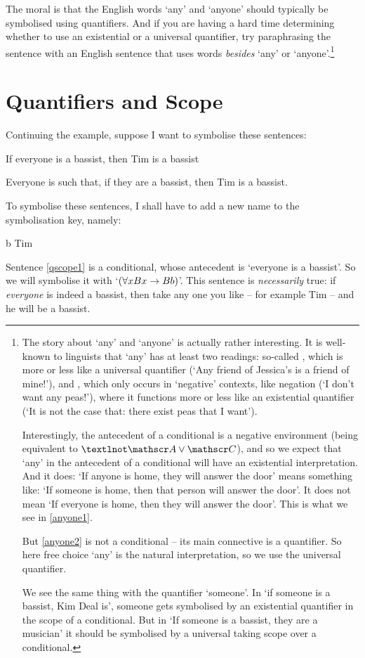 The moral is that the English words `any' and `anyone' should typically be symbolised using quantifiers. And if you are having a hard time determining whether to use an existential or a universal quantifier, try paraphrasing the sentence with an English sentence that uses words \emph{besides} `any' or `anyone'.\footnote{The story about `any' and `anyone' is actually rather interesting. It is well-known to linguists that `any' has at least two readings: so-called , which is more or less like a universal quantifier (`Any friend of Jessica's is a friend of mine!'), and , which only occurs in `negative' contexts, like negation (`I don't want any peas!'), where it functions more or less like an existential quantifier (`It is not the case that: there exist peas that I want'). 

		Interestingly, the antecedent of a conditional is a negative environment (being equivalent to $¬\meta{A}\vee\meta{C}$), and so we expect that `any' in the antecedent of a conditional will have an existential interpretation. And it does: `If anyone is home, they will answer the door' means something like: `If someone is home, then that person will answer the door'. It does not mean `If everyone is home, then they will answer the door'. This is what we see in \ref{anyone1}.

		But \ref{anyone2} is not a conditional – its main connective is a quantifier. So here free choice `any' is the natural interpretation, so we use the universal quantifier.

		We see the same thing with the quantifier `someone'. In `if someone is a bassist, Kim Deal is', someone gets symbolised by an existential quantifier in the scope of a conditional. But in `If someone is a bassist, they are a musician' it should be symbolised by a universal taking scope over a conditional.}


\section{Quantifiers and Scope}\label{s.quantifier.scope}
Continuing the example, suppose I want to symbolise these sentences:
	\begin{earg}
		\item[\ex{qscope1}] If everyone is a bassist, then Tim is a bassist
		\item[\ex{qscope2}] Everyone is such that, if they are a bassist, then Tim is a bassist.
	\end{earg}
To symbolise these sentences, I shall have to add a new name to the symbolisation key, namely:
	\begin{ekey}
		\item[b] Tim
	\end{ekey}
Sentence \ref{qscope1} is a conditional, whose antecedent is `everyone is a bassist'. So we will symbolise it with `$(\forall x Bx \rightarrow Bb)$'. This sentence is \emph{necessarily} true: if \emph{everyone} is indeed a bassist, then take any one you like – for example Tim – and he will be a bassist. 

